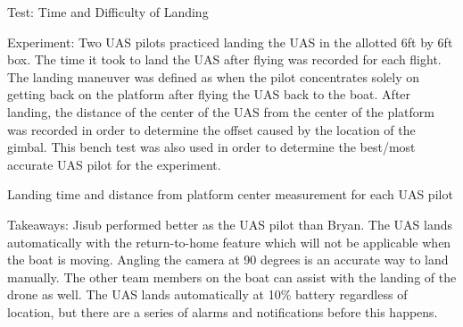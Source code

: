\documentclass{wrcecapstone}
\begin{document}
Test: Time and Difficulty of Landing

Experiment:
Two UAS pilots practiced landing the UAS in the allotted 6ft by 6ft box. The time it took to land the UAS after flying was recorded for each flight. The landing maneuver was defined as when the pilot concentrates solely on getting back on the platform after flying the UAS back to the boat.
After landing, the distance of the center of the UAS from the center of the platform was recorded in order to determine the offset caused by the location of the gimbal.  This bench test was also used in order to determine the best/most accurate UAS pilot for the experiment.

\begin{table}
\caption{Landing time and distance from platform center measurement for each UAS pilot}
\end{table}
 
Takeaways: 
Jisub performed better as the UAS pilot than Bryan. The UAS lands automatically with the return-to-home feature which will not be applicable when the boat is moving. Angling the camera at 90 degrees is an accurate way to land manually. The other team members on the boat can assist with the landing of the drone as well. The UAS lands automatically at 10\% battery regardless of location, but there are a series of alarms and notifications before this happens.
\end{document}
